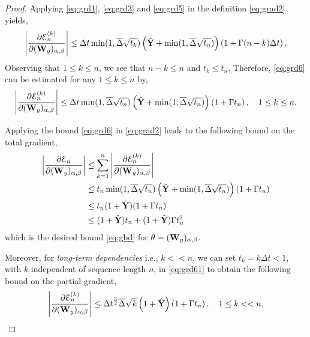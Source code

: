 \documentclass{article} \usepackage{iclr2022_conference,times}
\newcommand{\bW}{{\bf W}}
\newcommand{\bY}{{\bf Y}}
\newcommand{\Dt}{{\Delta t}}
\newcommand{\E}{\EuScript{E}}
\newcommand{\bdel}{\overline{\Delta}}
\begin{document}
\begin{proof}
Applying \eqref{eq:grd1}, \eqref{eq:grd3} and \eqref{eq:grd5} in the definition \eqref{eq:grad2} yields,
\begin{equation}
    \label{eq:grd61}
    \left|\frac{\partial \E^{(k)}_n}{\partial (\bW_y)_{\alpha,\beta}}\right| \leq 
    \Dt \min(1,\bdel\sqrt{t_k})\left(\hat{\bY} +   \min(1,\bdel \sqrt{t_n})\right) \left(1 + \Gamma(n-k)\Dt\right) .
\end{equation}
Observing that $1 \leq k \leq n$, we see that $n - k \leq n$ and $t_k \leq t_n$. Therefore, \eqref{eq:grd6} can be estimated for any $1 \leq k \leq n$ by, 
\begin{equation}
    \label{eq:grd6}
    \left|\frac{\partial \E^{(k)}_n}{\partial (\bW_y)_{\alpha,\beta}}\right| \leq 
    \Dt \min(1,\bdel\sqrt{t_n})\left(\hat{\bY} +  \min(1,\bdel \sqrt{t_n})\right) \left(1 + \Gamma t_n \right), \quad 1 \leq k \leq n.
\end{equation}

Applying the bound \eqref{eq:grd6} in \eqref{eq:grad2} leads to the following bound on the total gradient,
\begin{equation}
    \label{eq:grd8}
    \begin{aligned}
     \left|\frac{\partial \E_n}{\partial (\bW_y)_{\alpha,\beta}}\right| &\leq \sum\limits_{k=1}^n  \left|\frac{\partial \E^{(k)}_n}{\partial (\bW_y)_{\alpha,\beta}}\right| \\
     &\leq  t_n \min(1,\bdel\sqrt{t_n})\left(\hat{\bY} +  \min(1,\bdel \sqrt{t_n})\right) \left(1 + \Gamma t_n \right) \\
     &\leq t_n (1+\hat{\bY})(1+\Gamma t_n) \\
     &\leq (1+\hat{\bY}) t_n + (1+\hat{\bY}) \Gamma t_n^2
     \end{aligned}
\end{equation}
which is the desired bound \eqref{eq:gbd} for $\theta = (\bW_y)_{\alpha,\beta}$.



Moreover, for \emph{long-term dependencies} i.e., $k << n$, we can set $t_k = k \Dt < 1$, with $k$ independent of sequence length $n$, in \eqref{eq:grd61} to obtain the following bound on the partial gradient, 
\begin{equation}
    \label{eq:grd601}
    \left|\frac{\partial \E^{(k)}_n}{\partial (\bW_y)_{\alpha,\beta}}\right| \leq 
    \Dt^{\frac{3}{2}} \bdel\sqrt{k}\left(1+\hat{\bY}\right) \left(1 + \Gamma t_n \right), \quad 1 \leq k << n.
\end{equation}
\end{proof}
\end{document}
